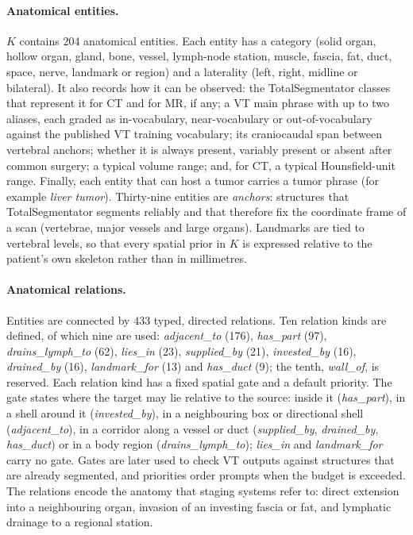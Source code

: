 \documentclass[fleqn,10pt]{olplainarticle}
\begin{document}
\paragraph{Anatomical entities.}
$K$ contains 204 anatomical entities. Each entity has a category (solid organ, hollow organ, gland, bone, vessel,
lymph-node station, muscle, fascia, fat, duct, space, nerve, landmark or region) and a laterality (left, right, midline
or bilateral). It also records how it can be observed: the TotalSegmentator classes that represent it for CT and for
MR, if any; a VT main phrase with up to two aliases, each graded as in-vocabulary, near-vocabulary or
out-of-vocabulary against the published VT training vocabulary; its craniocaudal span between vertebral anchors;
whether it is always present, variably present or absent after common surgery; a typical volume range; and, for CT, a
typical Hounsfield-unit range. Finally, each entity that can host a tumor carries a tumor phrase (for example
\emph{liver tumor}). Thirty-nine entities are \emph{anchors}: structures that TotalSegmentator segments reliably and
that therefore fix the coordinate frame of a scan (vertebrae, major vessels and large organs). Landmarks are tied to
vertebral levels, so that every spatial prior in $K$ is expressed relative to the patient's own skeleton rather than in
millimetres.

\paragraph{Anatomical relations.}
Entities are connected by 433 typed, directed relations. Ten relation kinds are defined, of which nine are used:
\emph{adjacent\_to} (176), \emph{has\_part} (97), \emph{drains\_lymph\_to} (62), \emph{lies\_in} (23),
\emph{supplied\_by} (21), \emph{invested\_by} (16), \emph{drained\_by} (16), \emph{landmark\_for} (13) and
\emph{has\_duct} (9); the tenth, \emph{wall\_of}, is reserved. Each relation kind has a fixed spatial gate and a default
priority. The gate states where the target may lie relative to the source: inside it (\emph{has\_part}), in a shell
around it (\emph{invested\_by}), in a neighbouring box or directional shell (\emph{adjacent\_to}), in a corridor along
a vessel or duct (\emph{supplied\_by}, \emph{drained\_by}, \emph{has\_duct}) or in a body region
(\emph{drains\_lymph\_to}); \emph{lies\_in} and \emph{landmark\_for} carry no gate. Gates are later used to check VT
outputs against structures that are already segmented, and priorities order prompts when the budget is exceeded. The relations encode the anatomy that staging systems refer to: direct extension
into a neighbouring organ, invasion of an investing fascia or fat, and lymphatic drainage to a regional station.
\end{document}
